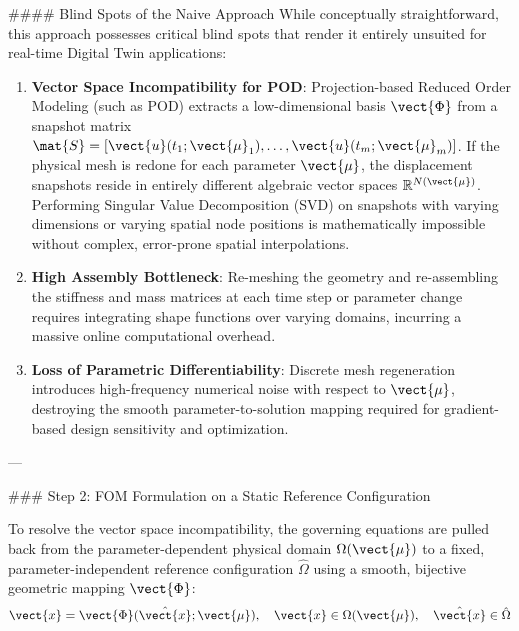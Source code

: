 #### Blind Spots of the Naive Approach
While conceptually straightforward, this approach possesses critical blind spots that render it entirely unsuited for real-time Digital Twin applications:
\begin{enumerate}
    \item \textbf{Vector Space Incompatibility for POD}: Projection-based Reduced Order Modeling (such as POD) extracts a low-dimensional basis $\vect{\Phi}$ from a snapshot matrix $\mat{S} = [\vect{u}(t_1; \vect{\mu}_1), \dots, \vect{u}(t_m; \vect{\mu}_m)]$. If the physical mesh is redone for each parameter $\vect{\mu}$, the displacement snapshots reside in entirely different algebraic vector spaces $\mathbb{R}^{N(\vect{\mu})}$. Performing Singular Value Decomposition (SVD) on snapshots with varying dimensions or varying spatial node positions is mathematically impossible without complex, error-prone spatial interpolations.
    \item \textbf{High Assembly Bottleneck}: Re-meshing the geometry and re-assembling the stiffness and mass matrices at each time step or parameter change requires integrating shape functions over varying domains, incurring a massive online computational overhead.
    \item \textbf{Loss of Parametric Differentiability}: Discrete mesh regeneration introduces high-frequency numerical noise with respect to $\vect{\mu}$, destroying the smooth parameter-to-solution mapping required for gradient-based design sensitivity and optimization.
\end{enumerate}

---

### Step 2: FOM Formulation on a Static Reference Configuration

To resolve the vector space incompatibility, the governing equations are pulled back from the parameter-dependent physical domain $\Omega(\vect{\mu})$ to a fixed, parameter-independent reference configuration $\hat{\Omega}$ using a smooth, bijective geometric mapping $\vect{\Phi}$:
\begin{equation}
\vect{x} = \vect{\Phi}(\hat{\vect{x}}; \vect{\mu}), \quad \vect{x} \in \Omega(\vect{\mu}), \quad \hat{\vect{x}} \in \hat{\Omega}
\end{equation}

